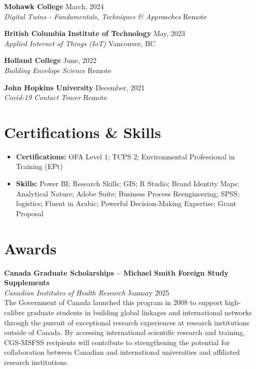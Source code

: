 \documentclass[11pt]{article}
\begin{document}
\noindent\textbf{Mohawk College} \hfill March, 2024 \\
\textit{Digital Twins - Fundamentals, Techniques \& Approaches} \hfill Remote

\vspace{8pt}

\noindent\textbf{British Columbia Institute of Technology} \hfill May, 2023 \\
\textit{Applied Internet of Things (IoT)} \hfill Vancouver, BC

\vspace{8pt}

\noindent\textbf{Holland College} \hfill June, 2022 \\
\textit{Building Envelope Science} \hfill Remote

\vspace{8pt}

\noindent\textbf{John Hopkins University} \hfill December, 2021 \\
\textit{Covid-19 Contact Tracer} \hfill Remote

\section{Certifications \& Skills}

\vspace{4pt}

\begin{itemize}[leftmargin=*, topsep=2pt, itemsep=1pt, parsep=0pt]
\item \textbf{Certifications:} OFA Level 1; TCPS 2; Environmental Professional in Training (EPt)
\item \textbf{Skills:} Power BI; Research Skills; GIS; R Studio; Brand Identity Maps; Analytical Nature; Adobe Suite; Business Process Reengineering; SPSS; logistics; Fluent in Arabic; Powerful Decision-Making Expertise; Grant Proposal
\end{itemize}

\section{Awards}

\vspace{4pt}

\noindent\textbf{Canada Graduate Scholarships – Michael Smith Foreign Study Supplements} \\
\textit{Canadian Institutes of Health Research} \hfill January 2025 \\
The Government of Canada launched this program in 2008 to support high-calibre graduate students in building global linkages and international networks through the pursuit of exceptional research experiences at research institutions outside of Canada. By accessing international scientific research and training, CGS-MSFSS recipients will contribute to strengthening the potential for collaboration between Canadian and international universities and affiliated research institutions.
\end{document}
